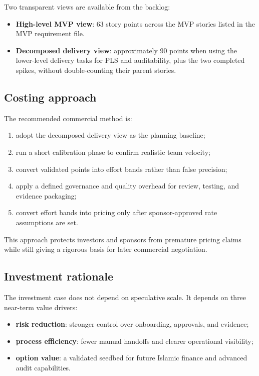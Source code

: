 \documentclass[11pt,a4paper]{article}
\begin{document}
Two transparent views are available from the backlog:

\begin{itemize}
    \item \textbf{High-level MVP view}: 63 story points across the MVP stories listed in the MVP requirement file.
    \item \textbf{Decomposed delivery view}: approximately 90 points when using the lower-level delivery tasks for PLS and auditability, plus the two completed spikes, without double-counting their parent stories.
\end{itemize}

\subsection{Costing approach}

The recommended commercial method is:

\begin{enumerate}[leftmargin=1.5em]
    \item adopt the decomposed delivery view as the planning baseline;
    \item run a short calibration phase to confirm realistic team velocity;
    \item convert validated points into effort bands rather than false precision;
    \item apply a defined governance and quality overhead for review, testing, and evidence packaging;
    \item convert effort bands into pricing only after sponsor-approved rate assumptions are set.
\end{enumerate}

This approach protects investors and sponsors from premature pricing claims while still giving a rigorous basis for later commercial negotiation.

\subsection{Investment rationale}

The investment case does not depend on speculative scale. It depends on three near-term value drivers:

\begin{itemize}
    \item \textbf{risk reduction}: stronger control over onboarding, approvals, and evidence;
    \item \textbf{process efficiency}: fewer manual handoffs and clearer operational visibility;
    \item \textbf{option value}: a validated seedbed for future Islamic finance and advanced audit capabilities.
\end{itemize}
\end{document}
